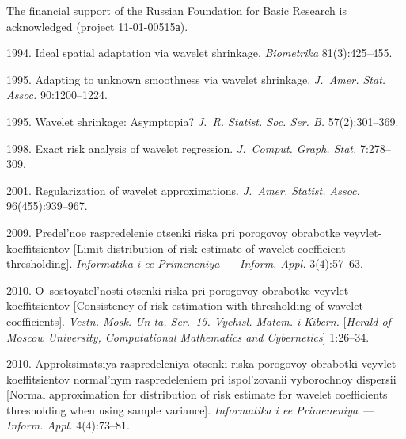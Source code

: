 \Ack
\noindent
The financial support of the Russian Foundation for Basic Research is acknowledged
(project 11-01-00515а).

  \begin{multicols}{2}

\renewcommand{\bibname}{\protect\rmfamily References}

{\small\frenchspacing
{%
\begin{thebibliography}{99}


1994. Ideal spatial adaptation via wavelet shrinkage.
\textit{Biometrika}  81(3):425--455.

1995. Adapting to unknown smoothness via wavelet shrinkage.
\textit{J.~Amer. Stat. Assoc.} 90:1200--1224.

1995. Wavelet shrinkage: Asymp\-to\-pia? \textit{J.~R. Statist. Soc. Ser. B.} 57(2):301--369.

1998. Exact risk analysis of wavelet regression. \textit{J.~Comput. Graph. Stat.} 7:278--309.

2001. Regularization of wavelet approximations. \textit{J.~Amer. Statist. Assoc.}
96(455):939--967.

2009. Predel'noe raspredelenie otsenki riska pri porogovoy obrabotke veyvlet-koeffitsientov 
[Limit distribution of risk estimate of wavelet coefficient thresholding].
\textit{Informatika i ee Primeneniya}~---
\textit{Inform. Appl.} 3(4):57--63.

2010. O~sostoyatel'nosti otsenki riska pri porogovoy obrabotke veyvlet-koeffitsientov 
[Consistency of risk estimation
with thresholding of wavelet coefficients]. \textit{Vestn. Mosk. Un-ta. Ser.~15. 
Vychisl. Matem. i Kibern.} [\textit{Herald of Moscow University, Computational Mathematics and 
Cybernetics}] 1:26--34.

2010. Approksimatsiya raspredeleniya otsenki riska porogovoy obrabotki 
veyvlet-koeffitsientov normal'nym raspredeleniem pri ispol'zovanii vyborochnoy dispersii 
[Normal approximation for distribution of risk estimate for wavelet coefficients thresholding 
when using sample variance]. \textit{Informatika i ee Primeneniya}~--- 
\textit{Inform. Appl.} 4(4):73--81.


\end{thebibliography}}}
\end{multicols}
